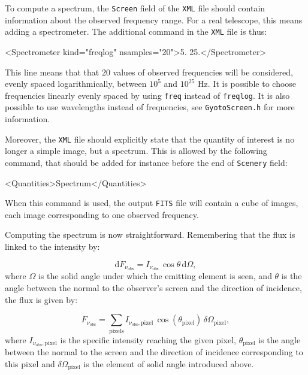 \documentclass[a4paper,12pt]{article}
\newcommand{\D}{\mathrm{d}}
\begin{document}
To compute a spectrum, the \texttt{Screen} field of the \texttt{XML} file should contain information about the observed frequency range. For a real telescope, this means adding a spectrometer. The additional command in the \texttt{XML} file is thus:

\begin{code}
<Spectrometer kind="freqlog" nsamples="20">5. 25.</Spectrometer>
\end{code}

This line means that that $20$ values of observed frequencies will be considered, evenly spaced logarithmically, between $10^{5}$ and $10^{25}$ Hz. It is possible to choose frequencies linearly evenly spaced by using \texttt{freq} instead of \texttt{freqlog}. It is also possible to use wavelengths instead of frequencies, see \texttt{GyotoScreen.h} for more information.

Moreover, the \texttt{XML} file should explicitly state that the quantity of interest is no longer a simple image, but a spectrum. This is allowed by the following command, that should be added for instance before the end of \texttt{Scenery} field:

\begin{code}
<Quantities>Spectrum</Quantities>
\end{code}
When this command is used, the output \texttt{FITS} file will contain a cube of images, each image corresponding to one observed frequency.

Computing the spectrum is now straightforward. Remembering that the flux is linked to the intensity by:

\begin{equation}
\D F_{\nu_{\mathrm{obs}}} = I_{\nu_{\mathrm{obs}}}\,\cos\theta\,\D \Omega,
\end{equation}
where $\Omega$ is the solid angle under which the emitting element is seen, and $\theta$ is the angle between the normal to the observer's screen and the direction 
of incidence, the flux is given by:

\begin{equation}
\label{deffluxGyoto}
F_{\nu_{\mathrm{obs}}} = \sum_{\mathrm{pixels}} I_{\nu_{\mathrm{obs}},\mathrm{pixel}}\,\cos(\theta_{\mathrm{pixel}})\,\delta\Omega_{\mathrm{pixel}} ,
\end{equation}
where $I_{\nu_{\mathrm{obs}},\mathrm{pixel}}$ is the specific intensity reaching the given pixel, $\theta_{\mathrm{pixel}}$ is the angle between the normal to the screen and the direction of incidence corresponding to this pixel and $\delta\Omega_{\mathrm{pixel}}$ is the element of solid angle introduced above. 
\end{document}
